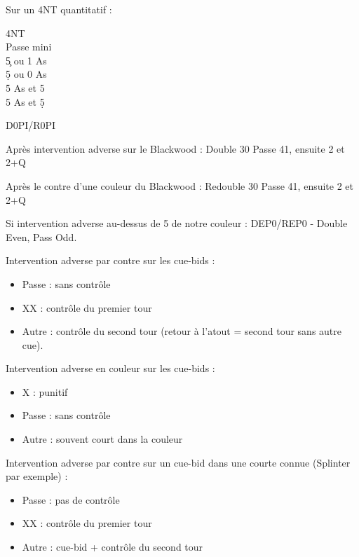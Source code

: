 \documentclass[a4paper]{article}
\begin{document}
Sur un 4NT quantitatif :

\begin{bidtable}
4NT\+\\
Passe \> mini\\
5\c {} ou 1 As\\
5\d {} ou 0 As\\
5\h {} As et 5\c \\
5\s {} As et 5\d \-
\end{bidtable}

D0PI/R0PI

Après intervention adverse sur le Blackwood :
Double 30 Passe 41, ensuite 2 et 2+Q

Après le contre d'une couleur du Blackwood :
Redouble 30 Passe 41, ensuite 2 et 2+Q

Si intervention adverse au-dessus de 5 de notre couleur :
DEP0/REP0 - Double Even, Pass Odd.

Intervention adverse par contre sur les cue-bids :

\begin{itemize}
\item Passe : sans contrôle

\item XX : contrôle du premier tour

\item Autre : contrôle du second tour (retour à l'atout = second tour sans autre cue).

\end{itemize}

Intervention adverse en couleur sur les cue-bids :

\begin{itemize}
\item X : punitif

\item Passe : sans contrôle

\item Autre : souvent court dans la couleur

\end{itemize}

Intervention adverse par contre sur un cue-bid dans une courte connue (Splinter par exemple) :

\begin{itemize}
\item Passe : pas de contrôle

\item XX : contrôle du premier tour

\item Autre : cue-bid + contrôle du second tour

\end{itemize}
\end{document}

